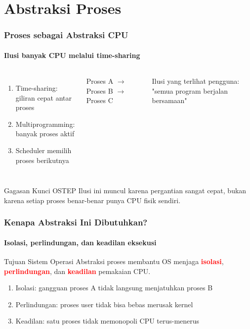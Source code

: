 \documentclass[t,aspectratio=169,xcolor=dvipsnames]{beamer}
\newcommand{\tem}[1]{\textbf{\textcolor{red}{#1}}}
\begin{document}
\section{Abstraksi Proses}

\begin{frame}
    \frametitle{Proses sebagai Abstraksi CPU}
    \framesubtitle{Ilusi banyak CPU melalui time-sharing}
    \small
    \begin{columns}[T]
        \begin{enumerate}
            \item Time-sharing: giliran cepat antar proses
            \item Multiprogramming: banyak proses aktif
            \item Scheduler memilih proses berikutnya
        \end{enumerate}
        Proses A $\rightarrow$ Proses B $\rightarrow$ Proses C

        \vspace{0.2cm}
        Ilusi yang terlihat pengguna:
        "semua program berjalan bersamaan"
    \end{columns}
    \begin{alertblock}{Gagasan Kunci OSTEP}
        Ilusi ini muncul karena pergantian sangat cepat, bukan karena setiap proses benar-benar punya CPU fisik sendiri.
    \end{alertblock}
\end{frame}

\begin{frame}
    \frametitle{Kenapa Abstraksi Ini Dibutuhkan?}
    \framesubtitle{Isolasi, perlindungan, dan keadilan eksekusi}
    \begin{block}{Tujuan Sistem Operasi}
        Abstraksi proses membantu OS menjaga \tem{isolasi}, \tem{perlindungan}, dan \tem{keadilan} pemakaian CPU.
    \end{block}
    \vspace{0.1cm}
    \small
    \begin{enumerate}
        \item Isolasi: gangguan proses A tidak langsung menjatuhkan proses B
        \item Perlindungan: proses user tidak bisa bebas merusak kernel
        \item Keadilan: satu proses tidak memonopoli CPU terus-menerus
    \end{enumerate}
\end{frame}
\end{document}

